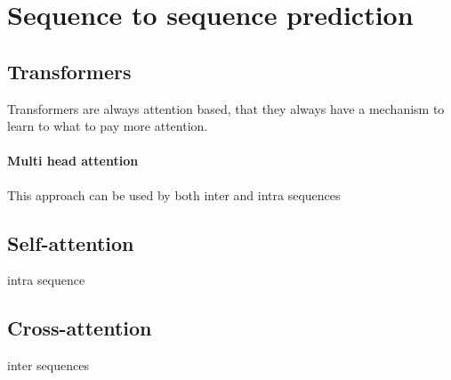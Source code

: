 \section {Sequence to sequence prediction}
    \subsection{Transformers}
        Transformers are always attention based, that they always have a mechanism to learn to what to pay more attention.
        
        \paragraph{Multi head attention}
            This approach can be used by both inter and intra sequences
        \subsection{Self-attention}
                intra sequence
        \subsection{Cross-attention}
            inter sequences

        
        
        